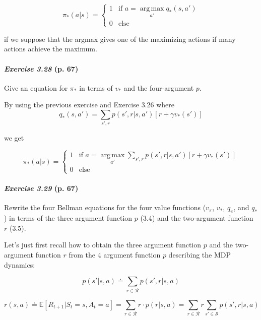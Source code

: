 \documentclass[10pt,a4paper]{article}
\DeclareMathOperator*{\argmax}{arg\,max}
\begin{document}
\begin{equation}
\pi_*(a \lvert s) = \begin{cases} 1 & \textrm{if } a = \argmax\limits_{a'} q_*(s, a')\\ 0 & \textrm{else}\end{cases}
\end{equation}

if we suppose that the argmax gives one of the maximizing actions if many actions achieve the maximum.

\paragraph{\textit{Exercise 3.28} (p. 67)} Give an equation for $\pi_*$ in terms of $v_*$ and the four-argument $p$.

\bigskip
By using the previous exercise and Exercise $3.26$ where
\begin{equation}
q_*(s, a') = \sum_{s', r} p(s', r \lvert s, a') \left[r + \gamma v_*(s')\right]
\end{equation}

we get

\begin{equation}
\pi_*(a \lvert s) = \begin{cases} 1 & \textrm{if } a = \argmax\limits_{a'} \sum_{s', r} p(s', r \lvert s, a') \left[r + \gamma v_*(s')\right] \\ 0 & \textrm{else}\end{cases}
\end{equation}

\paragraph{\textit{Exercise 3.29} (p. 67)} Rewrite the four Bellman equations for the four value functions ($v_\pi$, $v_*$, $q_\pi$,
and $q_*$) in terms of the three argument function $p$ ($3.4$) and the two-argument function $r$
($3.5$).

\bigskip
Let's just first recall how to obtain the three argument function $p$ and the two-argument function $r$ from the $4$ argument function $p$ describing the MDP dynamics:

\begin{equation}
p(s' \lvert s, a) \doteq \sum_{r \in \mathcal{R}} p(s', r \lvert s, a)
\end{equation}

\begin{equation}
r(s, a) \doteq \mathbb{E}[R_{t+1} \lvert S_t = s, A_t= a] = \sum_{r \in \mathcal{R}} r \cdot p(r \lvert s, a) = \sum_{r \in \mathcal{R}} r \sum_{s' \in \mathcal{S}} p(s', r \lvert s, a)
\end{equation}
\end{document}
